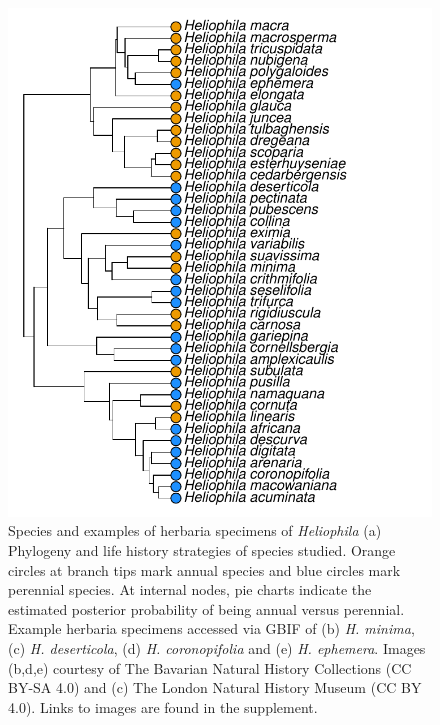 \documentclass[man,floatsintext]{apa6}
\theoremstyle{definition}
\theoremstyle{definition}
\theoremstyle{definition}
\theoremstyle{remark}
\begin{document}
\begin{figure}[!h]
\includegraphics[width=\textwidth]{../figures/phylogeny} \caption{Species and examples of herbaria specimens of
\emph{Heliophila} (a) Phylogeny and life history strategies of species
studied. Orange circles at branch tips mark annual species and blue
circles mark perennial species. At internal nodes, pie charts indicate
the estimated posterior probability of being annual versus perennial.
Example herbaria specimens accessed via GBIF of (b) \emph{H. minima},
(c) \emph{H. deserticola}, (d) \emph{H. coronopifolia} and (e) \emph{H.
ephemera}. Images (b,d,e) courtesy of The Bavarian Natural History
Collections (CC BY-SA 4.0) and (c) The London Natural History Museum (CC
BY 4.0). Links to images are found in the supplement.}\label{fig:phylogeny}
\end{figure}
\end{document}
